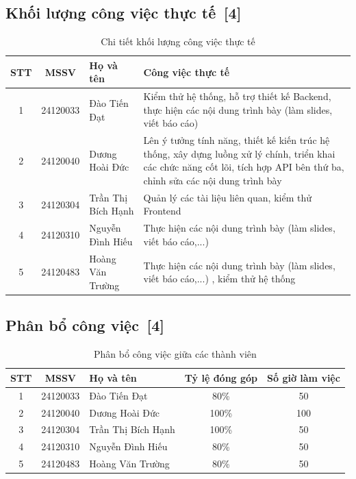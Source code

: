 \documentclass[12pt, a4paper]{article}
\begin{document}
\subsection[Khối lượng công việc thực tế]{Khối lượng công việc thực tế \,{\normalfont\small\textcolor{cyan!70!black}{[4]}}}
\renewcommand{\arraystretch}{1.5}
\begin{table}[H]
    \centering
    \begin{tabularx}{\textwidth}{|c|c|l|X|}
    \hline
    \textbf{STT} & \textbf{MSSV} & \textbf{Họ và tên} & \textbf{Công việc thực tế} \\
    \hline
    1 & 24120033 & Đào Tiến Đạt & Kiểm thử hệ thống, hỗ trợ thiết kế Backend, thực hiện các nội dung trình bày (làm slides, viết báo cáo) \\[1cm]
    \hline
    2 & 24120040 & Dương Hoài Đức & Lên ý tưởng tính năng, thiết kế kiến trúc hệ thống, xây dựng luồng xử lý chính, triển khai các chức năng cốt lõi, tích hợp API bên thứ ba, chỉnh sửa các nội dung trình bày \\
    \hline
    3 & 24120304 & Trần Thị Bích Hạnh & Quản lý các tài liệu liên quan, kiểm thử Frontend \\[1cm]
    \hline
    4 & 24120310 & Nguyễn Đình Hiếu & Thực hiện các nội dung trình bày (làm slides, viết báo cáo,...) \\[1cm]
    \hline
    5 & 24120483 & Hoàng Văn Trường & Thực hiện các nội dung trình bày (làm slides, viết báo cáo,...) , kiểm thử hệ thống \\[1cm]
    \hline
    \end{tabularx}
    \caption{Chi tiết khối lượng công việc thực tế}
\end{table}

\subsection[Phân bổ công việc]{Phân bổ công việc \,{\normalfont\small\textcolor{cyan!70!black}{[4]}}}

\vspace{0.5cm}
\renewcommand{\arraystretch}{1.5}
\begin{table}[H]
    \centering
    \begin{tabularx}{\textwidth}{@{} c c X c c @{}}
    \toprule
    \textbf{STT} & \textbf{MSSV} & \textbf{Họ và tên} & \textbf{Tỷ lệ đóng góp} & \textbf{Số giờ làm việc} \\
    \midrule
    1 & 24120033 & Đào Tiến Đạt & 80\% & 50 \\[0.5cm]
    2 & 24120040 & Dương Hoài Đức & 100\% & 100 \\[0.5cm]
    3 & 24120304 & Trần Thị Bích Hạnh & 100\% & 50 \\[0.5cm]
    4 & 24120310 & Nguyễn Đình Hiếu & 80\% & 50 \\[0.5cm]
    5 & 24120483 & Hoàng Văn Trường & 80\% & 50 \\[0.5cm]
    \bottomrule
    \end{tabularx}
    \caption{Phân bổ công việc giữa các thành viên}
\end{table}
\end{document}
